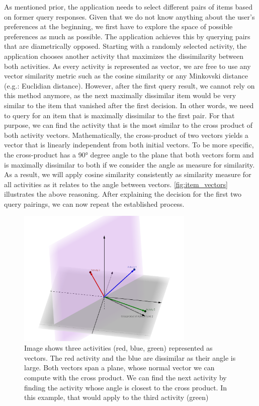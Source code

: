 \documentclass[11pt,a4paper,oneside]{article}
\begin{document}
As mentioned prior, the application needs to select different pairs of items based on former query responses. Given that we do not know anything about the user's preferences at the beginning, we first have to explore the space of possible preferences as much as possible. The application achieves this by querying pairs that are diametrically opposed. Starting with a randomly selected activity, the application chooses another activity that maximizes the dissimilarity between both activities. As every activity is represented as vector, we are free to use any vector similarity metric such as the cosine similarity or any Minkovski distance (e.g.: Euclidian distance). However, after the first query result, we cannot rely on this method anymore, as the next maximally dissimilar item would be very similar to the item that vanished after the first decision. In other words, we need to query for an item that is maximally dissimilar to the first pair. For that purpose, we can find the activity that is the most similar to the cross product of both activity vectors. Mathematically, the cross-product of two vectors yields a vector that is linearly independent from both initial vectors. To be more specific, the cross-product has a 90° degree angle to the plane that both vectors form and is maximally dissimilar to both if we consider the angle as measure for similarity. As a result, we will apply cosine similarity consistently as similarity measure for all activities as it relates to the angle between vectors. \autoref{fig:item_vectors} illustrates the above reasoning. After explaining the decision for the first two query pairings, we can now repeat the established process. 

\begin{figure}[H]
    \centering
    \includegraphics[width=0.75\textwidth]{paper/imgs/geogebra-export.png}
    \caption{Image shows three activities (red, blue, green) represented as vectors. The red activity and the blue are dissimilar as their angle is large. Both vectors span a plane, whose normal vector we can compute with the cross product. We can find the next activity by finding the activity whose angle is closest to the cross product. In this example, that would apply to the third activity (green)}
    \label{fig:item_vectors}
\end{figure}
\end{document}
